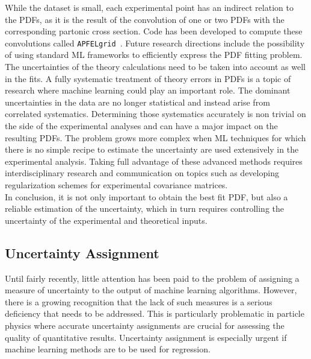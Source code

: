 While the dataset is small, each experimental point has an indirect relation to the PDFs, as it is the result of the convolution of one or two PDFs with the corresponding partonic cross section. Code has been developed to compute these convolutions called \texttt{APFELgrid}~\cite{Bertone:2016lga}. Future research directions include the possibility of using standard ML frameworks to efficiently express the PDF fitting problem.
The uncertainties of the theory calculations need to be taken into account as well in the fits. A fully systematic treatment of theory errors in PDFs is a topic of research where machine learning could play an important role.  The dominant uncertainties in the data are no longer statistical and instead arise from correlated systematics. Determining those systematics accurately is non trivial on the side of the experimental analyses and can have a major impact on the
resulting PDFs. The problem grows more complex when ML techniques for which there is no simple recipe to estimate the uncertainty are used extensively in the experimental analysis. Taking full advantage of these advanced methods requires interdisciplinary research and communication on topics such as developing regularization schemes for experimental covariance matrices.\\

In conclusion, it is not only important to obtain the best fit PDF, but also a reliable estimation of the uncertainty, which in turn requires controlling the uncertainty of the experimental and theoretical inputs.

\subsection{Uncertainty Assignment}\label{sec:uncertainty}
Until fairly recently, little attention has been paid to the problem of assigning a measure of uncertainty to the output of machine learning algorithms. However, there is a growing recognition that the lack of such measures is a serious deficiency that needs to be addressed. This is particularly problematic in particle physics where accurate uncertainty assignments are crucial for assessing the quality of quantitative results. Uncertainty assignment is especially  urgent if machine learning methods are to be used for regression.\\


